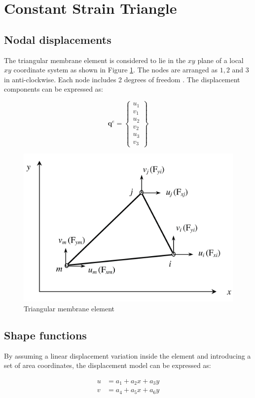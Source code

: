 
\section{Constant Strain Triangle}
\subsection{Nodal displacements}
The triangular membrane element is considered to lie in the $ xy $ plane of a local $ xy $ coordinate system as shown in Figure \ref{fig: CST_element}. The nodes are arranged as $ 1,2 $ and $ 3 $ in anti-clockwise. Each node includes 2 degrees of freedom . The displacement components can be expressed as:

\begin{equation}
\mathbf{q}^e = \left\lbrace
\begin{array}{c}
u_1 \\
v_1 \\
u_2 \\
v_2 \\
u_3 \\
v_3
\end{array} \right \rbrace
\end{equation}

\begin{figure}[h!]
	\centering
	\includegraphics[width=0.5\linewidth]{figures/CST_element}
	\caption{Triangular membrane element}
	\label{fig: CST_element}
\end{figure}

\subsection{Shape functions}
By assuming a linear displacement variation inside the element and introducing a set of area coordinates, the displacement model can be expressed as:

\begin{equation} \label{eq: CST_displacement_model}
\begin{split}
u &= a_1 + a_2 x + a_3 y \\
v &= a_4 + a_5 x + a_6 y
\end{split}
\end{equation}

